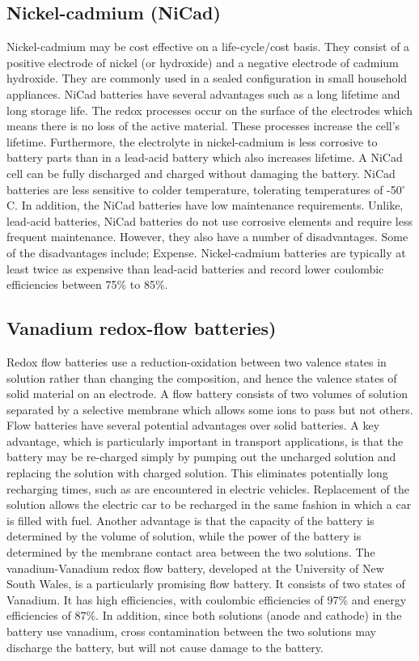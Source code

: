 \subsection{Nickel-cadmium (NiCad)}
Nickel-cadmium may be cost effective on a life-cycle/cost basis. They consist of a positive electrode of nickel (or hydroxide) and a negative electrode of cadmium hydroxide. They are commonly used in a sealed configuration in small household appliances. NiCad batteries have several advantages such as a long lifetime and long storage life. The redox processes occur on the surface of the electrodes which means there is no loss of the active material. These processes increase the cell's lifetime. Furthermore, the electrolyte in nickel-cadmium is less corrosive to battery parts than in a lead-acid battery which also increases lifetime. A NiCad cell can be fully discharged and charged without damaging the battery. NiCad batteries are less sensitive to colder temperature, tolerating temperatures of -50$^{\circ}$C. In addition, the NiCad batteries have low maintenance requirements. Unlike, lead-acid batteries, NiCad batteries do not use corrosive elements and require less frequent maintenance. However, they also have a number of disadvantages. Some of the disadvantages include; Expense. Nickel-cadmium batteries are typically at least twice as expensive than lead-acid batteries and record lower coulombic efficiencies between 75\% to 85\%.

\subsection{Vanadium redox-flow batteries)}
 Redox flow batteries use a reduction-oxidation between two valence states in solution rather than changing the composition, and hence the valence states of solid material on an electrode. A flow battery consists of two volumes of solution separated by a selective membrane which allows some ions to pass but not others. Flow batteries have several potential advantages over solid batteries. A key advantage, which is particularly important in transport applications, is that the battery may be re-charged simply by pumping out the uncharged solution and replacing the solution with charged solution. This eliminates potentially long recharging times, such as are encountered in electric vehicles. Replacement of the solution allows the electric car to be recharged in the same fashion in which a car is filled with fuel. Another advantage is that the capacity of the battery is determined by the volume of solution, while the power of the battery is determined by the membrane contact area between the two solutions. The vanadium-Vanadium redox flow battery, developed at the University of New South Wales, is a particularly promising flow battery. It consists of two states of Vanadium. It has high efficiencies, with coulombic efficiencies of 97\% and energy efficiencies of 87\%. In addition, since both solutions (anode and cathode) in the battery use vanadium, cross contamination between the two solutions may discharge the battery, but will not cause damage to the battery.
